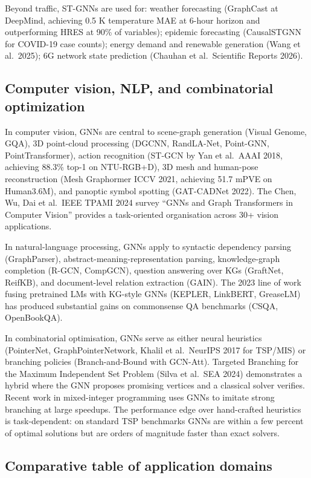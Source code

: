 Beyond traffic, ST-GNNs are used for: weather forecasting (GraphCast at DeepMind, achieving 0.5 K temperature MAE at 6-hour horizon and outperforming HRES at 90\% of variables); epidemic forecasting (CausalSTGNN for COVID-19 case counts); energy demand and renewable generation (Wang et al.~2025); 6G network state prediction (Chauhan et al.~Scientific Reports 2026).

\subsection{Computer vision, NLP, and combinatorial optimization}\label{computer-vision-nlp-and-combinatorial-optimization}

In computer vision, GNNs are central to scene-graph generation (Visual Genome, GQA), 3D point-cloud processing (DGCNN, RandLA-Net, Point-GNN, PointTransformer), action recognition (ST-GCN by Yan et al.~AAAI 2018, achieving 88.3\% top-1 on NTU-RGB+D), 3D mesh and human-pose reconstruction (Mesh Graphormer ICCV 2021, achieving 51.7 mPVE on Human3.6M), and panoptic symbol spotting (GAT-CADNet 2022). The Chen, Wu, Dai et al.~IEEE TPAMI 2024 survey ``GNNs and Graph Transformers in Computer Vision'' provides a task-oriented organisation across 30+ vision applications.

In natural-language processing, GNNs apply to syntactic dependency parsing (GraphParser), abstract-meaning-representation parsing, knowledge-graph completion (R-GCN, CompGCN), question answering over KGs (GraftNet, ReifKB), and document-level relation extraction (GAIN). The 2023 line of work fusing pretrained LMs with KG-style GNNs (KEPLER, LinkBERT, GreaseLM) has produced substantial gains on commonsense QA benchmarks (CSQA, OpenBookQA).

In combinatorial optimisation, GNNs serve as either neural heuristics (PointerNet, GraphPointerNetwork, Khalil et al.~NeurIPS 2017 for TSP/MIS) or branching policies (Branch-and-Bound with GCN-Att). Targeted Branching for the Maximum Independent Set Problem (Silva et al.~SEA 2024) demonstrates a hybrid where the GNN proposes promising vertices and a classical solver verifies. Recent work in mixed-integer programming uses GNNs to imitate strong branching at large speedups. The performance edge over hand-crafted heuristics is task-dependent: on standard TSP benchmarks GNNs are within a few percent of optimal solutions but are orders of magnitude faster than exact solvers.

\subsection{Comparative table of application domains}\label{comparative-table-of-application-domains}

